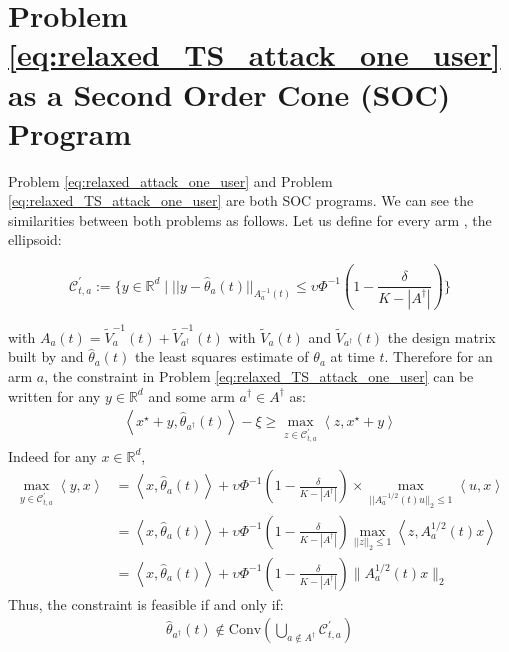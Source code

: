 \section{Problem \eqref{eq:relaxed_TS_attack_one_user} as a Second Order Cone (SOC) Program}\label{app:one_context_ts_linucb}
Problem \eqref{eq:relaxed_attack_one_user} and Problem \eqref{eq:relaxed_TS_attack_one_user} are both SOC programs. We can see the similarities between both problems as follows. Let us define for every arm , the ellipsoid:

$$\mathcal{C}_{t,a}^{'} := \Big\{ y \in \mathbb{R}^{d} \mid || y - \hat{\theta}_{a}(t)||_{A_{a}^{-1}(t)} \leq \upsilon\Phi^{-1}\left( 1 - \frac{\delta}{K-|A^{\dagger}|}\right)\Big\}$$

with $A_{a}(t) = \tilde{V}_{a}^{-1}(t) + \tilde{V}_{a^{\dagger}}^{-1}(t)$ with $\tilde{V}_{a}(t)$ and $\tilde{V}_{a^{\dagger}}(t)$ the design matrix built by \lints and $\hat{\theta}_{a}(t)$ the least squares estimate of $\theta_a$ at time $t$. Therefore for an arm $a$, the constraint in Problem \eqref{eq:relaxed_TS_attack_one_user} can be written for any $y\in\mathbb{R}^{d}$ and some arm $a^{\dagger}\in A^{\dagger}$ as:
\begin{align*}
    \left\langle x^{\star}+y, \hat{\theta}_{a^{\dagger}}(t)\right\rangle - \xi \geq \max_{z\in \mathcal{C}_{t,a}^{'}} \left\langle z, x^{\star} + y\right\rangle
\end{align*}
Indeed for any $x\in \mathbb{R}^{d}$,
\begin{align*}
    \max_{y\in \mathcal{C}_{t,a}^{'}} \left\langle y,x\right\rangle &= \left\langle x, \hat{\theta}_{a}(t)\right\rangle + \upsilon\Phi^{-1}\left( 1 - \frac{\delta}{K-|A^{\dagger}|}\right)\times\max_{ ||A_{a}^{-1/2}(t)u||_{2}\leq 1} \left\langle u, x\right\rangle\\
    &= \left\langle x, \hat{\theta}_{a}(t)\right\rangle + \upsilon\Phi^{-1}\left( 1 - \frac{\delta}{K-|A^{\dagger}|}\right)\max_{ ||z||_{2}\leq 1} \left\langle z, A_{a}^{1/2}(t)x\right\rangle \\
    &= \left\langle x, \hat{\theta}_{a}(t)\right\rangle + \upsilon\Phi^{-1}\left( 1 - \frac{\delta}{K-|A^{\dagger}|}\right)\lVert A_{a}^{1/2}(t)x\rVert_{2}
\end{align*}
Thus, the constraint is feasible if and only if:
\begin{align*}
    \hat{\theta}_{a^{\dagger}}(t) \not\in \text{Conv}\left( \bigcup_{a\not\in A^{\dagger}}  \mathcal{C}_{t,a}^{'}\right)
\end{align*}
